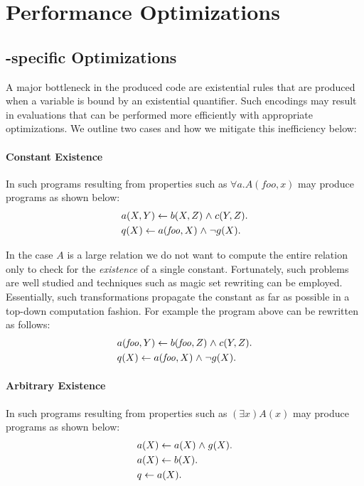 \section{Performance Optimizations}\label{sect:aws/optimizations}

\subsection{\Datalog-specific Optimizations}
A major bottleneck in the produced \Datalog code are existential rules 
that are produced when a variable is bound by an existential quantifier. Such encodings 
may result in evaluations that can be performed more efficiently with appropriate 
optimizations. We outline 
two cases and how we mitigate this inefficiency below:

\paragraph*{Constant Existence} In such \Datalog programs 
resulting from properties such as $\forall a . A(\mathit{foo}, x)$
may produce \Datalog programs as shown below:
\begin{align*}
&a(X,Y) \mathrel{\leftarrow} b(X,Z)\mathrel{\wedge} c(Y,Z).\\
&q(X) \mathrel{\leftarrow} a(\mathit{foo}, X)\mathrel{\wedge} \neg g(X).
\end{align*}

In the case $A$ is a large relation we do not want to 
compute the entire relation only to check for the 
\emph{existence} of a single constant. Fortunately, 
such \Datalog problems are well studied and techniques 
such as magic set rewriting can be employed. Essentially, 
such transformations propagate the constant as far as possible 
in a top-down computation fashion. For example the \Datalog 
program above can be rewritten as follows:
\begin{align*}
&a(\mathit{foo}, Y) \mathrel{\leftarrow} b(\mathit{foo}, Z)\mathrel{\wedge} c(Y,Z).\\
&q(X) \mathrel{\leftarrow} a(\mathit{foo}, X)\mathrel{\wedge} \neg g(X).
\end{align*}

\paragraph*{Arbitrary Existence} In such \Datalog programs 
resulting from properties such as $(\exists x)A(x)$
may produce \Datalog programs as shown below:
\begin{align*}
&a(X) \mathrel{\leftarrow} a(X)\mathrel{\wedge} g(X).\\
&a(X) \mathrel{\leftarrow} b(X).\\
&q \mathrel{\leftarrow} a(X).
\end{align*}

